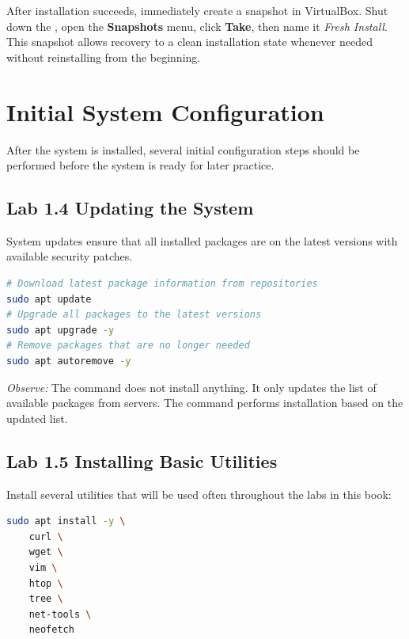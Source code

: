\begin{tipbox}
After installation succeeds, immediately create a snapshot in VirtualBox. Shut down the , open the \textbf{Snapshots} menu, click \textbf{Take}, then name it \textit{Fresh Install}. This snapshot allows recovery to a clean installation state whenever needed without reinstalling from the beginning.
\end{tipbox}

\section{Initial System Configuration}
\label{sec:post-installation}

After the system is installed, several initial configuration steps should be performed before the system is ready for later practice.

\subsection*{Lab 1.4 Updating the System}

System updates ensure that all installed packages are on the latest versions with available security patches.

\begin{lstlisting}[language=bash, caption={Updating system packages}]
# Download latest package information from repositories
sudo apt update
# Upgrade all packages to the latest versions
sudo apt upgrade -y
# Remove packages that are no longer needed
sudo apt autoremove -y
\end{lstlisting}

\textit{Observe:} The  command does not install anything. It only updates the list of available packages from  servers. The  command performs installation based on the updated list.

\subsection*{Lab 1.5 Installing Basic Utilities}

Install several utilities that will be used often throughout the labs in this book:

\begin{lstlisting}[language=bash, caption={Installing basic utilities}]
sudo apt install -y \
    curl \
    wget \
    vim \
    htop \
    tree \
    net-tools \
    neofetch
\end{lstlisting}

